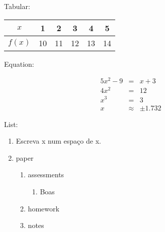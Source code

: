 \documentclass[a4paper,10pt]{article}
\begin{document}
Tabular:\\
\begin{tabular}{|c|ccccc|}

\hline
 $x$ & 1 & 2 & 3 & 4 & 5  \\\hline
 $f(x)$ & 10 & 11 & 12 & 13 & 14\\ \hline
 
 \end{tabular}

 \newpage
 Equation:
 
 \begin{eqnarray}%
  5x^2-9&=&x+3\\%
  4x^2&=&12\\
  x^3&=&3\\
  x&\approx&\pm1.732
 \end{eqnarray}

 List:
 \begin{enumerate}
  \item Escreva x num espaço de x.
  \item paper
  \begin{enumerate}
   \item assessments
   \begin {enumerate}
   \item Boas
   
   \end {enumerate}
   \item homework
   \item notes
   
  \end{enumerate}

 \end{enumerate}
  
\end{document}
